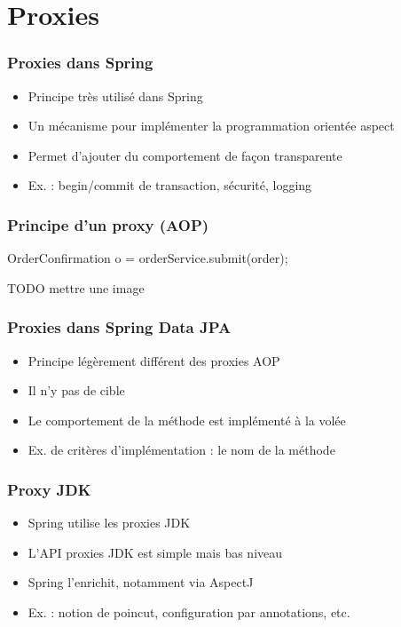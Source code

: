 \section{Proxies}



\begin{frame}
 \frametitle{Proxies dans Spring}
 \begin{itemize}
  \item Principe très utilisé dans Spring
  \item Un mécanisme pour implémenter la programmation orientée aspect
  \item Permet d'ajouter du comportement de façon transparente
  \item Ex. : begin/commit de transaction, sécurité, logging
 \end{itemize}

\end{frame}

\begin{frame}[fragile]
 \frametitle{Principe d'un proxy (AOP)}
 \begin{javacode}
OrderConfirmation o = orderService.submit(order);
 \end{javacode}

TODO mettre une image

\end{frame}

\begin{frame}
 \frametitle{Proxies dans Spring Data JPA}
 \begin{itemize}
  \item Principe légèrement différent des proxies AOP
  \item Il n'y pas de cible
  \item Le comportement de la méthode est implémenté à la volée
  \item Ex. de critères d'implémentation : le nom de la méthode
 \end{itemize}

\end{frame}

\begin{frame}
 \frametitle{Proxy JDK}
 \begin{itemize}
  \item Spring utilise les proxies JDK
  \item L'API proxies JDK est simple mais bas niveau
  \item Spring l'enrichit, notamment via AspectJ
  \item Ex. : notion de poincut, configuration par annotations, etc.
 \end{itemize}
\end{frame}

